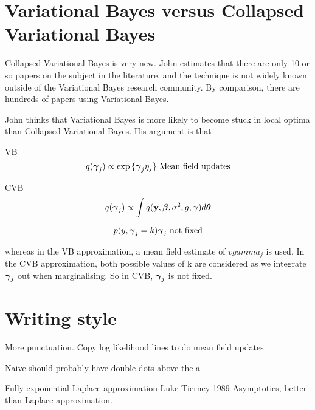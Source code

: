 \documentclass{amsart}
\begin{document}
\section{Variational Bayes versus Collapsed Variational Bayes}

Collapsed Variational Bayes is very new. John estimates that there are only 10 or so papers on the subject in
the literature, and the technique is not widely known outside of the Variational Bayes research community. By
comparison, there are hundreds of papers using Variational Bayes.

John thinks that Variational Bayes is more likely to become stuck in local optima than Collapsed Variational
Bayes. His argument is that

VB
$$q({\boldsymbol \gamma}_j) \propto \exp{ \{ {\boldsymbol\gamma}_j \eta_j \} } \text{ Mean field updates}$$

CVB
$$q({\boldsymbol \gamma}_j) \propto \int q({\bf y}, {\boldsymbol \beta}, \sigma^2, g, {\boldsymbol \gamma}) d {\boldsymbol \theta}$$

$$p(y, {\boldsymbol \gamma}_j = k) {\boldsymbol \gamma}_j\text{ not fixed}$$

whereas in the VB approximation, a mean field estimate of $vgamma_j$ is used. In the CVB approximation, both
possible values of k are considered as we integrate ${\boldsymbol \gamma}_j$ out when marginalising. So in CVB, ${\boldsymbol \gamma}_j$
is not fixed.

\section{Writing style}
More punctuation.
Copy log likelihood lines to do mean field updates

Naive should probably have double dots above the a

Fully exponential Laplace approximation Luke Tierney 1989 Asymptotics, better than Laplace approximation.
\end{document}
